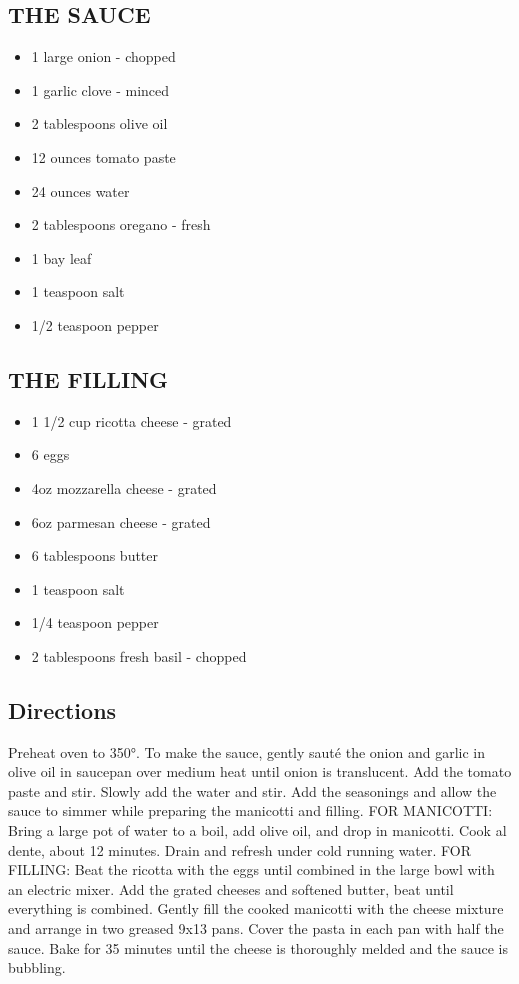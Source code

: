 \documentclass[
]{book}
\providecommand{\tightlist}{%
  \setlength{\itemsep}{0pt}\setlength{\parskip}{0pt}}
\begin{document}
\hypertarget{the-sauce}{%
\subsection*{THE SAUCE}\label{the-sauce}}


\begin{itemize}
\tightlist
\item
  1 large onion - chopped
\item
  1 garlic clove - minced
\item
  2 tablespoons olive oil
\item
  12 ounces tomato paste
\item
  24 ounces water
\item
  2 tablespoons oregano - fresh
\item
  1 bay leaf
\item
  1 teaspoon salt
\item
  1/2 teaspoon pepper
\end{itemize}

\hypertarget{the-filling}{%
\subsection*{THE FILLING}\label{the-filling}}


\begin{itemize}
\tightlist
\item
  1 1/2 cup ricotta cheese - grated
\item
  6 eggs
\item
  4oz mozzarella cheese - grated
\item
  6oz parmesan cheese - grated
\item
  6 tablespoons butter
\item
  1 teaspoon salt
\item
  1/4 teaspoon pepper
\item
  2 tablespoons fresh basil - chopped
\end{itemize}

\hypertarget{directions-46}{%
\subsection*{Directions}\label{directions-46}}


Preheat oven to 350°. To make the sauce, gently sauté the onion and garlic in olive oil
in saucepan over medium heat until onion is translucent. Add the tomato paste and stir.
Slowly add the water and stir. Add the seasonings and allow the sauce to simmer while preparing
the manicotti and filling. FOR MANICOTTI: Bring a large pot of water to a boil, add olive oil,
and drop in manicotti. Cook al dente, about 12 minutes. Drain and refresh under cold running water.
FOR FILLING: Beat the ricotta with the eggs until combined in the large bowl with an electric mixer.
Add the grated cheeses and softened butter, beat until everything is combined. Gently fill the
cooked manicotti with the cheese mixture and arrange in two greased 9x13 pans. Cover the pasta
in each pan with half the sauce. Bake for 35 minutes until the cheese is thoroughly melded and the sauce is bubbling.
\end{document}

